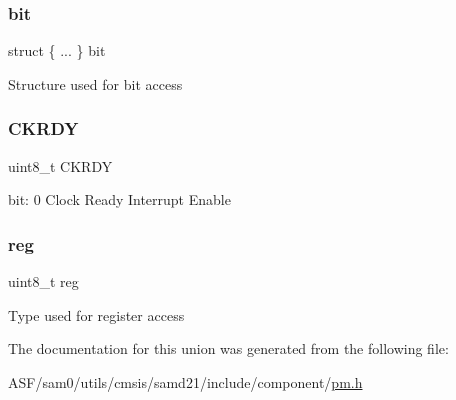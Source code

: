 \subsubsection{\texorpdfstring{bit}{bit}}
{\footnotesize\ttfamily struct \{ ... \}   bit}

Structure used for bit access \mbox{\label{union_p_m___i_n_t_e_n_s_e_t___type_adbe5f3203d63c6431c43561e9fed6517}} 
\subsubsection{\texorpdfstring{CKRDY}{CKRDY}}
{\footnotesize\ttfamily uint8\+\_\+t C\+K\+R\+DY}

bit\+: 0 Clock Ready Interrupt Enable \mbox{\label{union_p_m___i_n_t_e_n_s_e_t___type_a9428adc9af4653a2050e2536b55dec8d}} 
\subsubsection{\texorpdfstring{reg}{reg}}
{\footnotesize\ttfamily uint8\+\_\+t reg}

Type used for register access 

The documentation for this union was generated from the following file\+:\begin{DoxyCompactItemize}
\item 
A\+S\+F/sam0/utils/cmsis/samd21/include/component/\mbox{\hyperlink{component_2pm_8h}{pm.\+h}}\end{DoxyCompactItemize}
